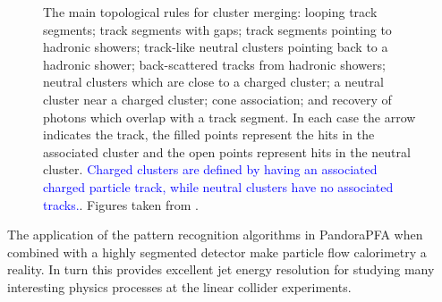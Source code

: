 \begin{figure}[h!]
\caption[The main topological rules for cluster merging: \protect{} looping track segments; \protect{} track segments with gaps; \protect{} track segments pointing to hadronic showers; \protect{} track-like neutral clusters pointing back to a hadronic shower; \protect{} back-scattered tracks from hadronic showers; \protect{} neutral clusters which are close to a charged cluster; \protect{} a neutral cluster near a charged cluster; \protect{} cone association; and \protect{} recovery of photons which overlap with a track segment.  In each case the arrow indicates the track, the filled points represent the hits in the associated cluster and the open points represent hits in the neutral cluster.  \textcolor{blue}{Charged clusters are defined by having an associated charged particle track, while neutral clusters have no associated tracks.} Figures taken from \cite{arXiv:0907.3577}.]{The main topological rules for cluster merging: \protect{} looping track segments; \protect{} track segments with gaps; \protect{} track segments pointing to hadronic showers; \protect{} track-like neutral clusters pointing back to a hadronic shower; \protect{} back-scattered tracks from hadronic showers; \protect{} neutral clusters which are close to a charged cluster; \protect{} a neutral cluster near a charged cluster; \protect{} cone association; and \protect{} recovery of photons which overlap with a track segment.  In each case the arrow indicates the track, the filled points represent the hits in the associated cluster and the open points represent hits in the neutral cluster.  \textcolor{blue}{Charged clusters are defined by having an associated charged particle track, while neutral clusters have no associated tracks.}. Figures taken from \cite{arXiv:0907.3577}.}
\label{fig:associations}
\end{figure} 

The application of the pattern recognition algorithms in PandoraPFA when combined with a highly segmented detector make particle flow calorimetry a reality.  In turn this provides excellent jet energy resolution for studying many interesting physics processes at the linear collider experiments.

